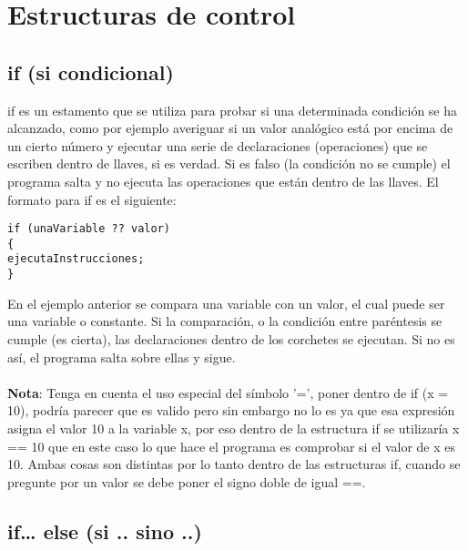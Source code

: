 \chapter{Estructuras de control}
\section{if (si condicional)}

if es un estamento que se utiliza para probar si una determinada condición se ha alcanzado, como por ejemplo averiguar si un valor analógico está por encima de un cierto número y ejecutar una serie de declaraciones (operaciones) que se escriben dentro de llaves, si es verdad. Si es falso (la condición no se cumple) el programa salta y no ejecuta las operaciones que están dentro de las llaves. El formato para if es el siguiente:
\begin{lstlisting}
if (unaVariable ?? valor)
{
ejecutaInstrucciones;
}
\end{lstlisting}
En el ejemplo anterior se compara una variable con un valor, el cual puede ser una variable o constante. Si la comparación, o la condición entre paréntesis se cumple (es cierta), las declaraciones dentro de los corchetes se ejecutan. Si no es así, el programa salta sobre ellas y sigue.\\\\
\textbf{Nota}: Tenga en cuenta el uso especial del símbolo '=', poner dentro de if (x = 10), podría parecer que es valido pero sin embargo no lo es ya que esa expresión asigna el valor 10 a la variable x, por eso dentro de la estructura if se utilizaría x == 10 que en este caso lo que hace el programa es comprobar si el valor de x es 10. Ambas cosas son distintas por lo tanto dentro de las estructuras if, cuando se pregunte por un valor se debe poner el signo doble de igual ==.

\section{if… else (si .. sino ..)}

